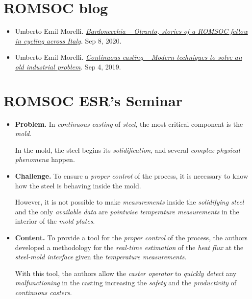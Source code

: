\documentclass{book}
\numberwithin{equation}{section}
\begin{document}
\section{ROMSOC blog}
\begin{itemize}
    \item Umberto Emil Morelli. \href{https://www.romsoc.eu/bardonecchia-otranto-stories-of-a-romsoc-fellow-in-cycling-across-italy/}{\textit{Bardonecchia -- Otranto, stories of a ROMSOC fellow in cycling across Italy}}. Sep 8, 2020.
    \item Umberto Emil Morelli. \href{https://www.romsoc.eu/continuous-casting-modern-techniques-to-solve-an-old-industrial-problem/}{\textit{Continuous casting -- Modern techniques to solve an old industrial problem}}. Sep 4, 2019.
\end{itemize}

\section{ROMSOC ESR's Seminar}
\begin{itemize}
    \item \textbf{Problem.} In \textit{continuous casting} of \textit{steel}, the most critical component is the \textit{mold}.
    
    In the mold, the steel begins its \textit{solidification}, and several \textit{complex physical phenomena} happen.
    \item \textbf{Challenge.} To ensure a \textit{proper control} of the process, it is necessary to know how the steel is behaving inside the mold.
    
    However, it is not possible to make \textit{measurements} inside the \textit{solidifying steel} and the only \textit{available data} are \textit{pointwise temperature measurements} in the interior of the \textit{mold plates}.
    \item \textbf{Content.} To provide a tool for the \textit{proper control} of the process, the authors developed a methodology for the  \textit{real-time estimation} of the \textit{heat flux} at the \textit{steel-mold interface} given the \textit{temperature measurements}.
    
    With this tool, the authors allow the \textit{caster operator} to \textit{quickly detect} any \textit{malfunctioning} in the casting increasing the \textit{safety} and the \textit{productivity} of \textit{continuous casters}.
\end{itemize}
\end{document}
